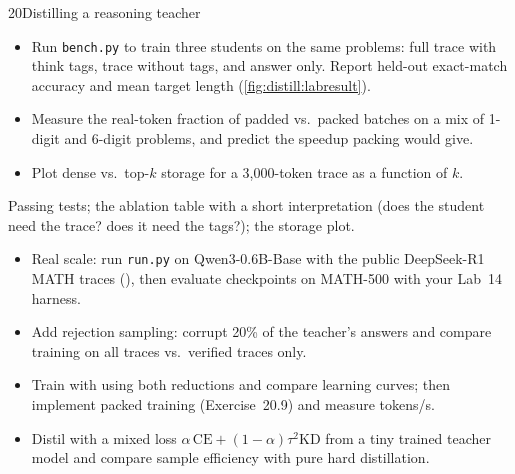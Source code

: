 \begin{labbox}{20}{Distilling a reasoning teacher}
\begin{itemize}
\item Run \texttt{bench.py} to train three students on the same problems: full trace with think
tags, trace without tags, and answer only. Report held-out exact-match accuracy and mean target
length (\cref{fig:distill:labresult}).
\item Measure the real-token fraction of padded vs.\ packed batches on a mix of 1-digit and 6-digit
problems, and predict the speedup packing would give.
\item Plot dense vs.\ top-$k$ storage for a 3{,}000-token trace as a function of $k$.
\end{itemize}

Passing tests; the ablation table with a short interpretation (does the student need the trace?
does it need the tags?); the storage plot.

\begin{itemize}
\item Real scale: run \texttt{run.py} on Qwen3-0.6B-Base with the public DeepSeek-R1 MATH traces
(), then evaluate checkpoints on MATH-500 with your
Lab~14 harness.
\item Add rejection sampling: corrupt 20\% of the teacher's answers and compare training on all
traces vs.\ verified traces only.
\item Train with  using both reductions and compare learning curves; then
implement packed training (Exercise~20.9) and measure tokens/s.
\item Distil with a mixed loss $\alpha\,\text{CE}+(1-\alpha)\tau^2\text{KD}$ from a tiny trained
teacher model and compare sample efficiency with pure hard distillation.
\end{itemize}
\end{labbox}
